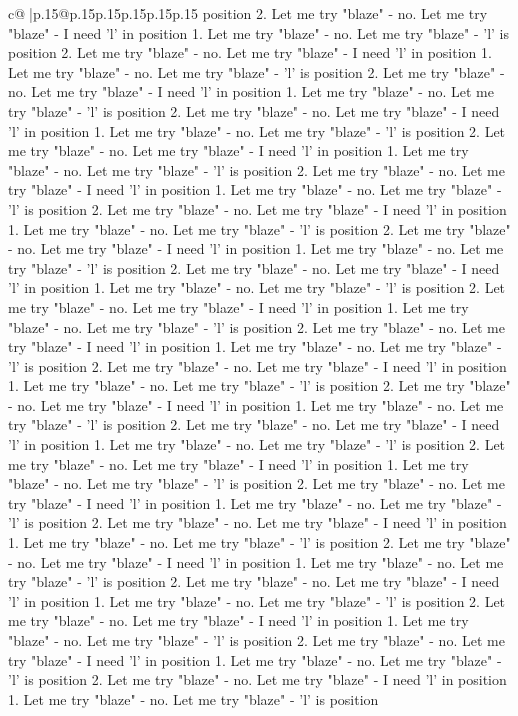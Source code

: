 \documentclass{article}
\begin{document}
{\begin{supertabular}{c@{$\;$}|p{.15\linewidth}@{}p{.15\linewidth}p{.15\linewidth}p{.15\linewidth}p{.15\linewidth}p{.15\linewidth}}
{{{position 2. Let me try "blaze" {-} no. Let me try "blaze" {-} I need 'l' in position 1. Let me try "blaze" {-} no. Let me try "blaze" {-} 'l' is position 2. Let me try "blaze" {-} no. Let me try "blaze" {-} I need 'l' in position 1. Let me try "blaze" {-} no. Let me try "blaze" {-} 'l' is position 2. Let me try "blaze" {-} no. Let me try "blaze" {-} I need 'l' in position 1. Let me try "blaze" {-} no. Let me try "blaze" {-} 'l' is position 2. Let me try "blaze" {-} no. Let me try "blaze" {-} I need 'l' in position 1. Let me try "blaze" {-} no. Let me try "blaze" {-} 'l' is position 2. Let me try "blaze" {-} no. Let me try "blaze" {-} I need 'l' in position 1. Let me try "blaze" {-} no. Let me try "blaze" {-} 'l' is position 2. Let me try "blaze" {-} no. Let me try "blaze" {-} I need 'l' in position 1. Let me try "blaze" {-} no. Let me try "blaze" {-} 'l' is position 2. Let me try "blaze" {-} no. Let me try "blaze" {-} I need 'l' in position 1. Let me try "blaze" {-} no. Let me try "blaze" {-} 'l' is position 2. Let me try "blaze" {-} no. Let me try "blaze" {-} I need 'l' in position 1. Let me try "blaze" {-} no. Let me try "blaze" {-} 'l' is position 2. Let me try "blaze" {-} no. Let me try "blaze" {-} I need 'l' in position 1. Let me try "blaze" {-} no. Let me try "blaze" {-} 'l' is position 2. Let me try "blaze" {-} no. Let me try "blaze" {-} I need 'l' in position 1. Let me try "blaze" {-} no. Let me try "blaze" {-} 'l' is position 2. Let me try "blaze" {-} no. Let me try "blaze" {-} I need 'l' in position 1. Let me try "blaze" {-} no. Let me try "blaze" {-} 'l' is position 2. Let me try "blaze" {-} no. Let me try "blaze" {-} I need 'l' in position 1. Let me try "blaze" {-} no. Let me try "blaze" {-} 'l' is position 2. Let me try "blaze" {-} no. Let me try "blaze" {-} I need 'l' in position 1. Let me try "blaze" {-} no. Let me try "blaze" {-} 'l' is position 2. Let me try "blaze" {-} no. Let me try "blaze" {-} I need 'l' in position 1. Let me try "blaze" {-} no. Let me try "blaze" {-} 'l' is position 2. Let me try "blaze" {-} no. Let me try "blaze" {-} I need 'l' in position 1. Let me try "blaze" {-} no. Let me try "blaze" {-} 'l' is position 2. Let me try "blaze" {-} no. Let me try "blaze" {-} I need 'l' in position 1. Let me try "blaze" {-} no. Let me try "blaze" {-} 'l' is position 2. Let me try "blaze" {-} no. Let me try "blaze" {-} I need 'l' in position 1. Let me try "blaze" {-} no. Let me try "blaze" {-} 'l' is position 2. Let me try "blaze" {-} no. Let me try "blaze" {-} I need 'l' in position 1. Let me try "blaze" {-} no. Let me try "blaze" {-} 'l' is position 2. Let me try "blaze" {-} no. Let me try "blaze" {-} I need 'l' in position 1. Let me try "blaze" {-} no. Let me try "blaze" {-} 'l' is position 2. Let me try "blaze" {-} no. Let me try "blaze" {-} I need 'l' in position 1. Let me try "blaze" {-} no. Let me try "blaze" {-} 'l' is position 2. Let me try "blaze" {-} no. Let me try "blaze" {-} I need 'l' in position 1. Let me try "blaze" {-} no. Let me try "blaze" {-} 'l' is position 2. Let me try "blaze" {-} no. Let me try "blaze" {-} I need 'l' in position 1. Let me try "blaze" {-} no. Let me try "blaze" {-} 'l' is position }}}
\end{supertabular}}
\end{document}
